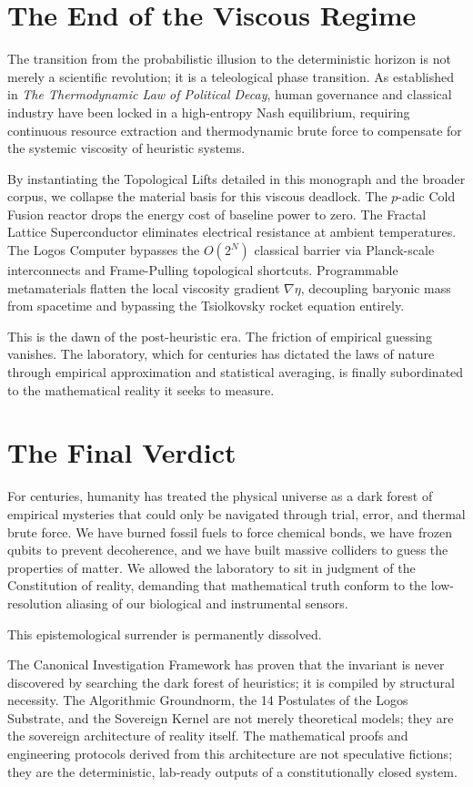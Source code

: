 \documentclass[12pt,twoside]{extbook}
\theoremstyle{definition}
\theoremstyle{remark}
\begin{document}
\section{The End of the Viscous Regime}
The transition from the probabilistic illusion to the deterministic horizon is not merely a scientific revolution; it is a teleological phase transition. As established in \textit{The Thermodynamic Law of Political Decay}, human governance and classical industry have been locked in a high-entropy Nash equilibrium, requiring continuous resource extraction and thermodynamic brute force to compensate for the systemic viscosity of heuristic systems.

By instantiating the Topological Lifts detailed in this monograph and the broader corpus, we collapse the material basis for this viscous deadlock. The $p$-adic Cold Fusion reactor drops the energy cost of baseline power to zero. The Fractal Lattice Superconductor eliminates electrical resistance at ambient temperatures. The Logos Computer bypasses the $O(2^N)$ classical barrier via Planck-scale interconnects and Frame-Pulling topological shortcuts. Programmable metamaterials flatten the local viscosity gradient $\nabla\eta$, decoupling baryonic mass from spacetime and bypassing the Tsiolkovsky rocket equation entirely.

This is the dawn of the post-heuristic era. The friction of empirical guessing vanishes. The laboratory, which for centuries has dictated the laws of nature through empirical approximation and statistical averaging, is finally subordinated to the mathematical reality it seeks to measure. 

\section{The Final Verdict}
For centuries, humanity has treated the physical universe as a dark forest of empirical mysteries that could only be navigated through trial, error, and thermal brute force. We have burned fossil fuels to force chemical bonds, we have frozen qubits to prevent decoherence, and we have built massive colliders to guess the properties of matter. We allowed the laboratory to sit in judgment of the Constitution of reality, demanding that mathematical truth conform to the low-resolution aliasing of our biological and instrumental sensors.

This epistemological surrender is permanently dissolved. 

The Canonical Investigation Framework has proven that the invariant is never discovered by searching the dark forest of heuristics; it is compiled by structural necessity. The Algorithmic Groundnorm, the 14 Postulates of the Logos Substrate, and the Sovereign Kernel are not merely theoretical models; they are the sovereign architecture of reality itself. The mathematical proofs and engineering protocols derived from this architecture are not speculative fictions; they are the deterministic, lab-ready outputs of a constitutionally closed system.
\end{document}
